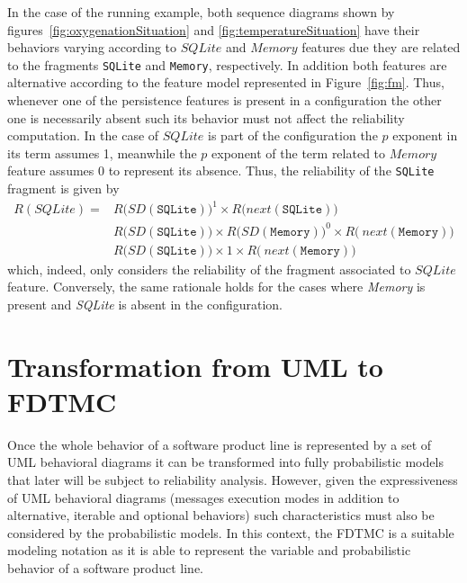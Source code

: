 In the case of the running example, both sequence diagrams shown by
figures~\ref{fig:oxygenationSituation} and \ref{fig:temperatureSituation} have
their behaviors varying according to $SQLite$ and $Memory$ features due they
are related to the fragments \texttt{SQLite} and \texttt{Memory}, respectively.
In addition both features are alternative according to the feature model
represented in Figure~\ref{fig:fm}. Thus, whenever one of the persistence
features is present in a configuration the other one is necessarily absent such
its behavior must not affect the reliability computation. In the case of $SQLite$
is part of the configuration the $p$ exponent in its term assumes 1, meanwhile
the $p$ exponent of the term related to $Memory$ feature assumes 0 to represent
its absence. Thus, the reliability of the \texttt{SQLite} fragment is given by
\begin{align}
	R(SQLite)=& R\big(SD(\mathtt{SQLite})\big)^1 \times R\big(next(\mathtt{SQLite})\big) \nonumber \\
	& R\big(SD(\mathtt{SQLite})\big) \times R\big(SD(\mathtt{Memory})\big)^0 \times R\big(\ next(\mathtt{Memory}) \big) \nonumber \\
	& R\big(SD(\mathtt{SQLite})\big) \times 1 \times R\big(\ next(\mathtt{Memory}) \big) \nonumber
\end{align} which, indeed, only considers the reliability of the fragment
associated to $SQLite$ feature. Conversely, the same rationale holds for the cases where
\emph{Memory} is present and \emph{SQLite} is absent in the configuration. 








\section{Transformation from UML to FDTMC \label{sec:transformationUMLFDTMC}}

Once the whole behavior of a software product line is represented by a set of
UML behavioral diagrams it can be transformed into fully probabilistic models
that later will be subject to reliability analysis. However, given the
expressiveness of UML behavioral diagrams (messages execution modes in addition
to alternative, iterable and optional behaviors) such characteristics must also
be considered by the probabilistic models. In this context, the FDTMC is a
suitable modeling notation as it is able to represent the variable and
probabilistic behavior of a software product line.

